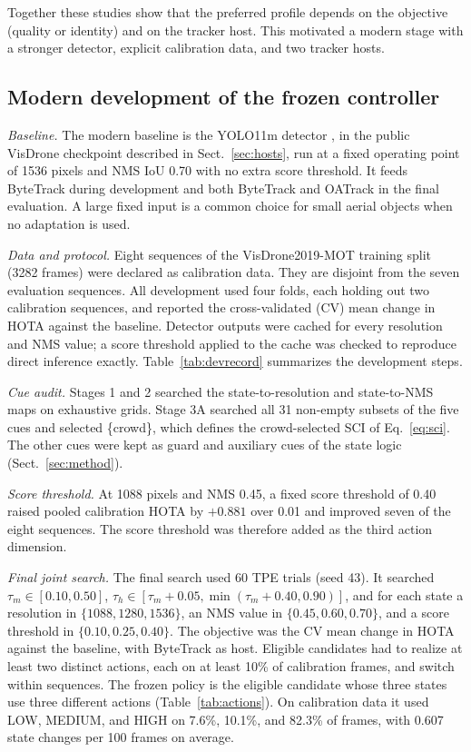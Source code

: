 \documentclass[pdflatex,sn-mathphys-num,iicol]{sn-jnl}
\begin{document}
Together these studies show that the preferred profile depends on the
objective (quality or identity) and on the tracker host. This motivated a
modern stage with a stronger detector, explicit calibration data, and two
tracker hosts.

\subsection{Modern development of the frozen controller}\label{sec:modern}

\emph{Baseline.} The modern baseline is the YOLO11m detector
\cite{jocher2024yolo11}, in the public VisDrone checkpoint described in
Sect.~\ref{sec:hosts}, run at a fixed operating point of 1536 pixels and NMS
IoU 0.70 with no extra score threshold. It feeds ByteTrack
\cite{zhang2022bytetrack} during development and both ByteTrack and OATrack
\cite{qi2026oatrack} in the final evaluation. A large fixed input is a common
choice for small aerial objects when no adaptation is used.

\emph{Data and protocol.} Eight sequences of the VisDrone2019-MOT training split
(3282 frames) were declared as calibration data. They are disjoint from the
seven evaluation sequences. All development used four folds, each holding out
two calibration sequences, and reported the cross-validated (CV) mean change
in HOTA against the baseline. Detector outputs were cached for every
resolution and NMS value; a score threshold applied to the cache was checked
to reproduce direct inference exactly. Table~\ref{tab:devrecord} summarizes
the development steps.

\emph{Cue audit.} Stages 1 and 2 searched the state-to-resolution and
state-to-NMS maps on exhaustive grids. Stage 3A searched all 31 non-empty
subsets of the five cues and selected \{crowd\}, which defines the
crowd-selected SCI of Eq.~\eqref{eq:sci}. The other cues were kept as guard and
auxiliary cues of the state logic (Sect.~\ref{sec:method}).

\emph{Score threshold.} At 1088 pixels and NMS 0.45, a fixed score threshold
of 0.40 raised pooled calibration HOTA by $+0.881$ over 0.01 and improved
seven of the eight sequences. The score threshold was therefore added as the
third action dimension.

\emph{Final joint search.} The final search used 60 TPE trials (seed 43). It
searched $\tau_m\in[0.10,0.50]$, $\tau_h\in[\tau_m+0.05,\min(\tau_m+0.40,0.90)]$,
and for each state a resolution in $\{1088,1280,1536\}$, an NMS value in
$\{0.45,0.60,0.70\}$, and a score threshold in $\{0.10,0.25,0.40\}$. The
objective was the CV mean change in HOTA against the baseline, with ByteTrack
as host. Eligible candidates had to realize at least two distinct actions,
each on at least 10\% of calibration frames, and switch within sequences. The
frozen policy is the eligible candidate whose three states use three
different actions (Table~\ref{tab:actions}). On calibration data it used LOW,
MEDIUM, and HIGH on 7.6\%, 10.1\%, and 82.3\% of frames, with 0.607 state
changes per 100 frames on average.
\end{document}

